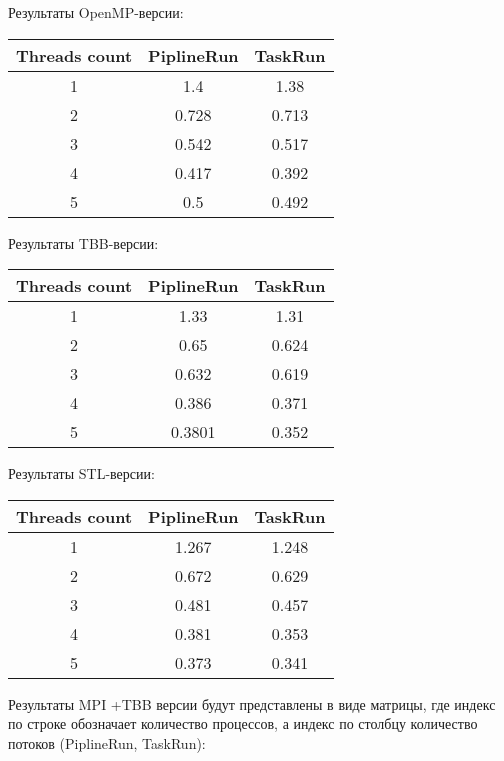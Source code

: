 \documentclass[12pt]{article}
\begin{document}
Результаты OpenMP-версии:
\begin{center}
    \begin{tabular}{|c|c|c|}
    \cline{1-3}
     Threads count & PiplineRun & TaskRun\\
       \hline
      1 & 1.4 & 1.38 \\
       \hline
      2 & 0.728 & 0.713 \\
       \hline
      3 & 0.542 & 0.517 \\
       \hline
      4 & 0.417& 0.392 \\
       \hline
      5 & 0.5 & 0.492 \\
    \cline{1-3}
    \end{tabular}
\end{center}

Результаты TBB-версии:
\begin{center}
    \begin{tabular}{|c|c|c|}
    \cline{1-3}
     Threads count & PiplineRun & TaskRun\\
       \hline
      1 & 1.33 & 1.31 \\
       \hline
      2 & 0.65 & 0.624 \\
       \hline
      3 & 0.632 & 0.619 \\
       \hline
      4 & 0.386 & 0.371 \\ 
       \hline
      5 & 0.3801 & 0.352 \\
    \cline{1-3}
    \end{tabular}
\end{center}
\newpage
Результаты STL-версии:
\begin{center}
    \begin{tabular}{|c|c|c|}
    \cline{1-3}
     Threads count & PiplineRun & TaskRun\\
       \hline
      1 & 1.267 & 1.248 \\
       \hline
      2 & 0.672 & 0.629 \\
       \hline
      3 & 0.481 & 0.457 \\
       \hline
      4 & 0.381 & 0.353 \\
       \hline
      5 & 0.373 & 0.341 \\
    \cline{1-3}
    \end{tabular}
\end{center}

Результаты MPI +TBB версии будут представлены в виде матрицы, где индекс по строке обозначает количество процессов, а индекс по столбцу количество потоков (PiplineRun, TaskRun):
\end{document}
